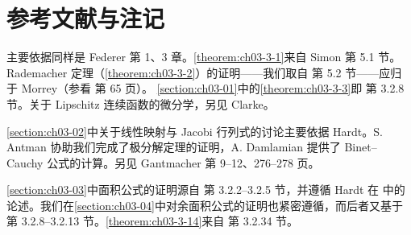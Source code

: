\documentclass[../../main.tex]{subfiles}%
\begin{document}
\section{参考文献与注记}\label{section:ch03-05}

主要依据同样是 Federer\cite{federer1969} 第 1、3 章。\cref{theorem:ch03-3-1}来自 Simon\cite{simon1984} 第 5.1 节。%
Rademacher 定理（\cref{theorem:ch03-3-2}）的证明——我们取自\cite{simon1984} 第 5.2 节——应归于 Morrey（参看\cite{morrey1966} 第 65 页）。%
\cref{section:ch03-01}中的\cref{theorem:ch03-3-3}即\cite{federer1969} 第 3.2.8 节。关于 Lipschitz 连续函数的微分学，另见 Clarke\cite{clarke1983}。%

\cref{section:ch03-02}中关于线性映射与 Jacobi 行列式的讨论主要依据 Hardt\cite{hardt1979}。S. Antman 协助我们完成了极分解定理的证明，A. Damlamian 提供了 Binet--Cauchy 公式的计算。另见 Gantmacher\cite{gantmacher1977} 第 9--12、276--278 页。%

\cref{section:ch03-03}中面积公式的证明源自\cite{federer1969} 第 3.2.2--3.2.5 节，并遵循 Hardt 在\cite{hardt1979} 中的论述。我们在\cref{section:ch03-04}中对余面积公式的证明也紧密遵循\cite{hardt1979}，而后者又基于\cite{federer1969} 第 3.2.8--3.2.13 节。\cref{theorem:ch03-3-14}来自\cite{federer1969} 第 3.2.34 节。%
\end{document}
